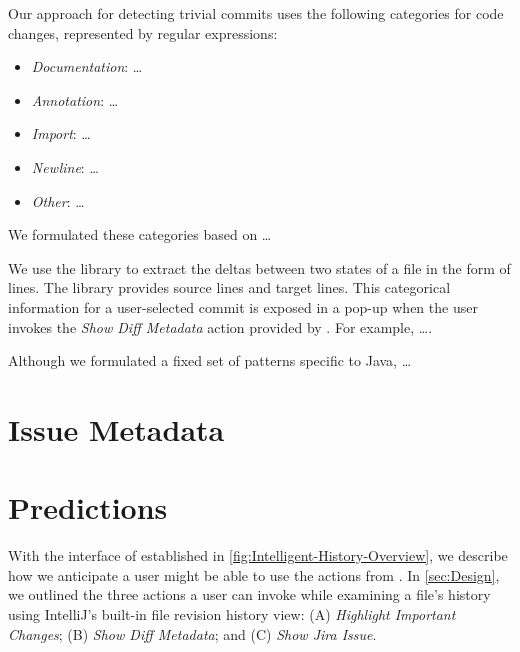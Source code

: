 Our approach for detecting trivial commits uses the following categories for code changes, represented by regular expressions: 

\begin{itemize}
    \item \textit{Documentation}: \dots
    \item \textit{Annotation}: \dots
    \item \textit{Import}: \dots
    \item \textit{Newline}: \dots
    \item \textit{Other}: \dots
\end{itemize}

We formulated these categories based on \dots {}

We use the  \cite{java-diff-utils} library to extract the deltas between two states of a file in the form of lines. 
The library provides source lines and target lines. 
This categorical information for a user-selected commit is exposed in a pop-up when the user invokes the \textit{Show Diff Metadata} action provided by .
For example, \dots {}.

Although we formulated a fixed set of patterns specific to Java, \dots {}

\section{Issue Metadata}
\label{sec:Issue-Metadata}


\section{Predictions}
\label{sec:Predictions}

With the interface of  established in \autoref{fig:Intelligent-History-Overview}, we describe how we anticipate a user might be able to use the actions from . 
In \autoref{sec:Design}, we outlined the three actions a user can invoke while examining a file's history using IntelliJ's built-in file revision history view: (A) \textit{Highlight Important Changes}; (B) \textit{Show Diff Metadata}; and (C) \textit{Show Jira Issue}.

\endinput

Any text after an \endinput is ignored.
You could put scraps here or things in progress.